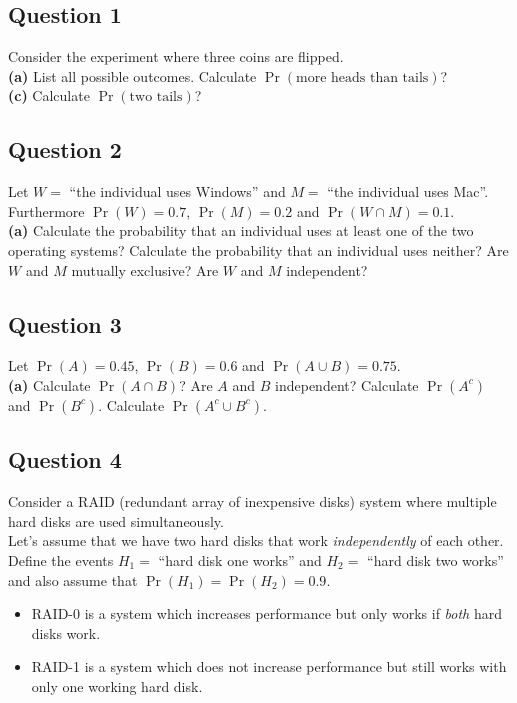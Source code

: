 \documentclass[12pt]{article}
\begin{document}
\subsection*{Question 1}

Consider the experiment where three coins are flipped. \\[-0.2cm]

{\bf(a)} List all possible outcomes.  Calculate $\Pr(\text{more heads than tails})$? \quad \\{\bf(c)} Calculate $\Pr(\text{two tails})$?


\subsection*{Question 2}

Let $W = $ ``the individual uses Windows'' and $M = $ ``the individual uses Mac''.\\ Furthermore $\Pr(W) = 0.7$, $\Pr(M) = 0.2$ and $\Pr(W \cap M) = 0.1$.\\[-0.2cm]

{\bf(a)} Calculate the probability that an individual uses at least one of the two operating systems?  Calculate the probability that an individual uses neither?  Are $W$ and $M$ mutually exclusive?  Are $W$ and $M$ independent?


\subsection*{Question 3}

Let $\Pr(A) = 0.45$, $\Pr(B) = 0.6$ and $\Pr(A \cup B) = 0.75$.\\[-0.2cm]

{\bf(a)} Calculate $\Pr(A \cap B)$?  Are $A$ and $B$ independent?  Calculate  $\Pr(A^c)$ and $\Pr(B^c)$.  Calculate  $\Pr(A^c \cup B^c)$.


\subsection*{Question 4}
Consider a RAID (redundant array of inexpensive disks) system where multiple hard disks are used simultaneously.\\[0.2cm]
Let's assume that we have two hard disks that work \emph{independently} of each other. Define the events $H_1 =$ ``hard disk one works'' and $H_2 =$ ``hard disk two works'' and also assume that $\Pr(H_1) = \Pr(H_2) = 0.9$.\\[-0.5cm]
\begin{itemize}
\item RAID-0 is a system which increases performance but only works if \emph{both} hard disks work.
\item RAID-1 is a system which does not increase performance but still works with only one working hard disk.
\end{itemize}
\end{document}
